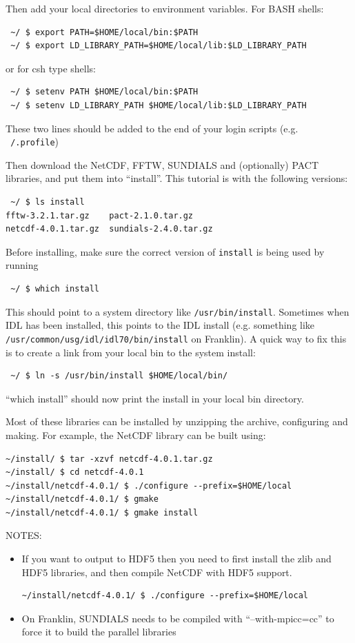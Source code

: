 \documentclass[12pt]{article}
\begin{document}
Then add your local directories to environment variables. For BASH shells:
\begin{verbatim}
 ~/ $ export PATH=$HOME/local/bin:$PATH
 ~/ $ export LD_LIBRARY_PATH=$HOME/local/lib:$LD_LIBRARY_PATH
\end{verbatim}
or for csh type shells:
\begin{verbatim}
 ~/ $ setenv PATH $HOME/local/bin:$PATH
 ~/ $ setenv LD_LIBRARY_PATH $HOME/local/lib:$LD_LIBRARY_PATH
\end{verbatim}
These two lines should be added to the end of your login scripts (e.g. \texttt{~/.profile})

Then download the NetCDF, FFTW, SUNDIALS and (optionally) PACT libraries, and put them into ``install''. This
tutorial is with the following versions:
\begin{verbatim}
 ~/ $ ls install
fftw-3.2.1.tar.gz    pact-2.1.0.tar.gz
netcdf-4.0.1.tar.gz  sundials-2.4.0.tar.gz
\end{verbatim}

Before installing, make sure the correct version of \texttt{install} is being used by running
\begin{verbatim}
 ~/ $ which install
\end{verbatim}
This should point to a system directory like \texttt{/usr/bin/install}. Sometimes when IDL has been
installed, this points to the IDL install (e.g. something like \texttt{/usr/common/usg/idl/idl70/bin/install} on Franklin). A quick way to fix this is to create a link from your local bin to the system install:
\begin{verbatim}
 ~/ $ ln -s /usr/bin/install $HOME/local/bin/
\end{verbatim}
``which install'' should now print the install in your local bin directory.

Most of these libraries can be installed by unzipping the archive, configuring and making. For example, the NetCDF library can be built using:
\begin{verbatim}
~/install/ $ tar -xzvf netcdf-4.0.1.tar.gz
~/install/ $ cd netcdf-4.0.1
~/install/netcdf-4.0.1/ $ ./configure --prefix=$HOME/local
~/install/netcdf-4.0.1/ $ gmake
~/install/netcdf-4.0.1/ $ gmake install
\end{verbatim}

NOTES: 
\begin{itemize}
\item If you want to output to HDF5 then you need to first install
  the zlib and HDF5 libraries, and then compile NetCDF with HDF5 support.
\begin{verbatim}
~/install/netcdf-4.0.1/ $ ./configure --prefix=$HOME/local
\end{verbatim}
\item On Franklin, SUNDIALS needs to be compiled with ``--with-mpicc=cc'' to
  force it to build the parallel libraries
\end{itemize}
\end{document}
